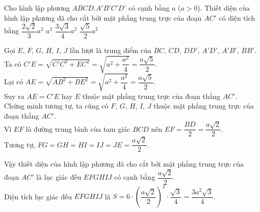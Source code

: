 \begin{ex}%
Cho hình lập phương $ABCD.A'B'C'D'$ có cạnh bằng $a$ ($a>0$). Thiết diện của hình lập phương đã cho cắt bởi mặt phẳng trung trực của đoạn $AC'$ có diện tích bằng
\choice
{$\dfrac{2\sqrt{2}}{3}a^2$}
{$a^2$}
{\True $\dfrac{3\sqrt{3}}{4}a^2$}
{$\dfrac{\sqrt{5}}{2}a^2$}
\loigiai
{
\immini
{
Gọi $E$, $F$, $G$, $H$, $I$, $J$ lần lượt là trung điểm của $BC$, $CD$, $DD'$, $A'D'$, $A'B'$, $BB'$.\\
Ta có $C'E=\sqrt{C'C^2+EC^2} = \sqrt{a^2+\dfrac{a^2}{4}} = \dfrac{a\sqrt{5}}{2}$.\\
Lại có $AE=\sqrt{AB^2+BE^2} = \sqrt{a^2+\dfrac{a^2}{4}} = \dfrac{a\sqrt{5}}{2}$.\\
Suy ra $AE=C'E$ hay $E$ thuộc mặt phẳng trung trực của đoạn thẳng $AC'$.\\
Chứng minh tương tự, ta cũng có $F$, $G$, $H$, $I$, $J$ thuộc mặt phẳng trung trực của đoạn thẳng $AC'$.\\
Vì $EF$ là đường trung bình của tam giác $BCD$ nên $EF=\dfrac{BD}{2}=\dfrac{a\sqrt{2}}{2}$.\\
Tương tự, $FG=GH=HI=IJ=JE=\dfrac{a\sqrt{2}}{2}$.
}
{
}
\noindent
Vậy thiết diện của hình lập phương đã cho cắt bởi mặt phẳng trung trực của đoạn $AC'$ là lục giác đều $EFGHIJ$ có cạnh bằng $\dfrac{a\sqrt{2}}{2}$.\\
Diện tích lục giác đều $EFGHIJ$ là $S=6\cdot \left(\dfrac{a\sqrt{2}}{2}\right)^2\cdot \dfrac{\sqrt{3}}{4} = \dfrac{3a^2\sqrt{3}}{4}$.
}
\end{ex}

